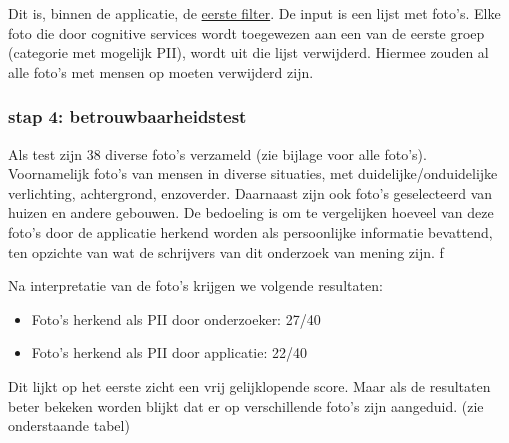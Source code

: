 Dit is, binnen de applicatie, de \underline{eerste filter}. De input is een lijst met foto's.
Elke foto die door cognitive services wordt toegewezen aan een  van de eerste groep (categorie met mogelijk PII), wordt uit die lijst verwijderd. Hiermee zouden al alle foto's met mensen op moeten verwijderd zijn.

\subsubsection{stap 4: betrouwbaarheidstest}
Als test zijn 38 diverse foto's verzameld (zie bijlage voor alle foto's). Voornamelijk foto's van mensen in diverse situaties, met duidelijke/onduidelijke verlichting, achtergrond, enzoverder. 
Daarnaast zijn ook foto's geselecteerd van huizen en andere gebouwen. De bedoeling is om te vergelijken hoeveel van deze foto's door de applicatie herkend worden als persoonlijke informatie bevattend, ten opzichte van wat de schrijvers van dit onderzoek van mening zijn. f


Na interpretatie van de foto's krijgen we volgende resultaten: 
\begin{itemize}
	\item Foto's herkend als PII door onderzoeker: 27/40
	\item Foto's herkend als PII door applicatie: 22/40
\end{itemize}
Dit lijkt op het eerste zicht een vrij gelijklopende score. Maar als de resultaten beter bekeken worden blijkt dat er op verschillende foto's zijn aangeduid. (zie onderstaande tabel)

